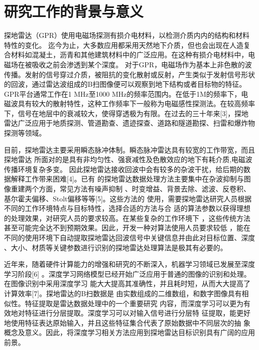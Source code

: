 \thesischapterexordium

\section{研究工作的背景与意义}

探地雷达（GPR）使用电磁场探测有损介电材料，以检测介质内内的结构和材料特性的变化。
迄今为止，大多数应用都采用天然地下介质，但也会出现在人造复合材料如混凝土，沥青和其他建筑材料中的广泛应用。在这种有损介电材料中，电磁场在被吸收之前会渗透到某个深度。
对于GPR，电磁场作为基本上非色散的波传播。发射的信号穿过介质，被阻抗的变化散射或反射，产生类似于发射信号形状的回波，通过雷达波组成的B扫图像便可以观察到地下结构或者目标物的特征。GPR平台通常工作在1 MHz至1000 MHz的频率范围内。在低于1M的频率下，电磁波具有较大的散射特性，这种工作频率下一般称为电磁感性探测法。在较高频率下，信号在地层中的衰减较大，使得穿透极为有限。在过去的三十年来[3]，探地雷达广泛应用于地质探测、管道勘查、遗迹探查、道路和隧道勘探、扫雷和爆炸物探测等领域。

目前，探地雷达主要采用瞬态脉冲体制。瞬态脉冲雷达具有较宽的工作带宽，而且探地雷达
所面对的是具有非均匀性、强衰减性及色散效应的地下有耗介质,电磁波传播环境复杂多变。
因此探地雷达接收回波中会有较多的杂波干扰，给后期的数据解释工作带来困难[4]。已有
的探地雷达数据处理方法主要集中在杂波抑制与图像重建两个方面，常见方法有噪声抑制
、时变增益、背景去除、滤波、反卷积、基尔霍夫偏移、Stolt偏移等等[5]。这些方法的
使用，需要探地雷达研究人员根据不同的工作环境特点与目标特性，选择合适的方法与合
适的算法参数以获得理想的处理效果，对研究人员的要求较高。在某些复杂的工作环境下
，这些传统方法甚至可能完全达不到预期效果。因此，开发一种对算法使用人员要求较低
，能在不同的使用环境下自动提取探地雷达回波信号中关键信息并由此对目标位置、深度
、大小、材质等关键参数进行识别的探地雷达处理算法是极其有必要的。

近年来，随着硬件计算能力的增强和研究的不断深入，机器学习领域已发展至深度学习阶段[6]
。深度学习网络模型已经开始广泛应用于普通的图像的识别和处理。在图像识别中采用深度学习
能大大提高其准确性，并且耗时短，从而大大提高了计算效率[7]。探地雷达的B扫数据是
由实数组成的二维数组，和数字图像具有相似性。特征提取是雷达数据处理中的一个重要研究
内容，而深度学习可以更为有效地对特征进行分层提取。深度学习可以对输入信号进行分层特
征提取，能更好地使用特征表达原始输入，并且这些特征集合代表了原始数据中不同层次的抽
象概念及意义。因此，将深度学习相关方法应用到探地雷达目标识别具有广阔的应用前景。


